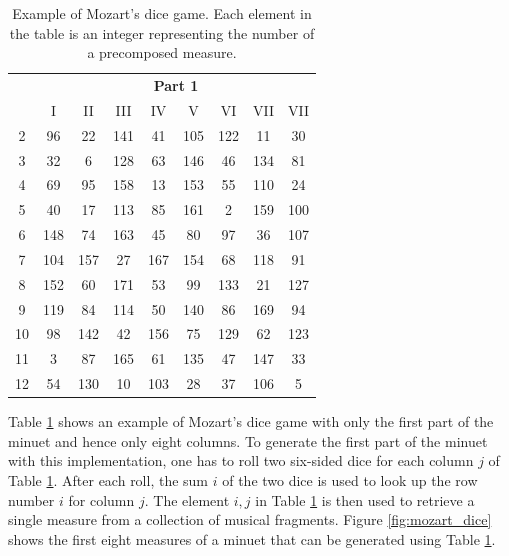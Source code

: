 \begin{table}[!h]
    \centering
    \begin{tabular}{ccccccccc}
    \toprule
    & \multicolumn{8}{c}{\textbf{Part 1}} \\
    & I & II & III & IV & V & VI & VII & VII \\
    \midrule
    2  & 96  & 22  & 141 & 41  & 105 & 122 & 11  & 30  \\
    3  & 32  & 6   & 128 & 63  & 146 & 46  & 134 & 81  \\
    4  & 69  & 95  & 158 & 13  & 153 & 55  & 110 & 24  \\
    5  & 40  & 17  & 113 & 85  & 161 & 2   & 159 & 100 \\
    6  & 148 & 74  & 163 & 45  & 80  & 97  & 36  & 107 \\
    7  & 104 & 157 & 27  & 167 & 154 & 68  & 118 & 91  \\
    8  & 152 & 60  & 171 & 53  & 99  & 133 & 21  & 127 \\
    9  & 119 & 84  & 114 & 50  & 140 & 86  & 169 & 94  \\
    10 & 98  & 142 & 42  & 156 & 75  & 129 & 62  & 123 \\
    11 & 3   & 87  & 165 & 61  & 135 & 47  & 147 & 33  \\
    12 & 54  & 130 & 10  & 103 & 28  & 37  & 106 & 5   \\
    \bottomrule
    \end{tabular}
    \caption{Example of Mozart's dice game. Each element in the table is an integer
    representing the number of a precomposed measure.}
    \label{tab:mozart_dice}
\end{table}

Table \ref{tab:mozart_dice} shows an example of Mozart's dice game with only the first part of the minuet and hence only eight columns. To generate the first part of the minuet with this implementation, one has to roll two six-sided dice for each column $j$ of Table \ref{tab:mozart_dice}. After each roll, the sum $i$  of the two dice is
used to look up the row number $i$ for column $j$. The element $i,j$ in Table \ref{tab:mozart_dice}
is then used to retrieve a single measure from a collection of musical fragments.
Figure \ref{fig:mozart_dice} shows the first eight measures of a minuet that can
be generated using Table \ref{tab:mozart_dice}.

